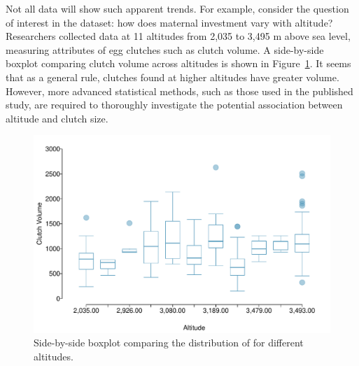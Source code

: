 

Not all data will show such apparent trends. For example, consider the question of interest in the  dataset: how does maternal investment vary with altitude? Researchers collected data at 11 altitudes from 2,035 to 3,495 m above sea level, measuring attributes of egg clutches such as clutch volume. A side-by-side boxplot comparing clutch volume across altitudes is shown in Figure~\ref{frogClutchVolAlt}. It seems that as a general rule, clutches found at higher altitudes have greater volume. However, more advanced statistical methods, such as those used in the published study, are required to thoroughly investigate the potential association between altitude and clutch size. 

\begin{figure}
	\centering
	\includegraphics[width=\textwidth]{ch_intro_to_data_oi_biostat/figures/frogClutchVolAlt/frogClutchVolAlt}
	\caption{Side-by-side boxplot comparing the distribution of  for different altitudes.}
	\label{frogClutchVolAlt}
\end{figure} 


